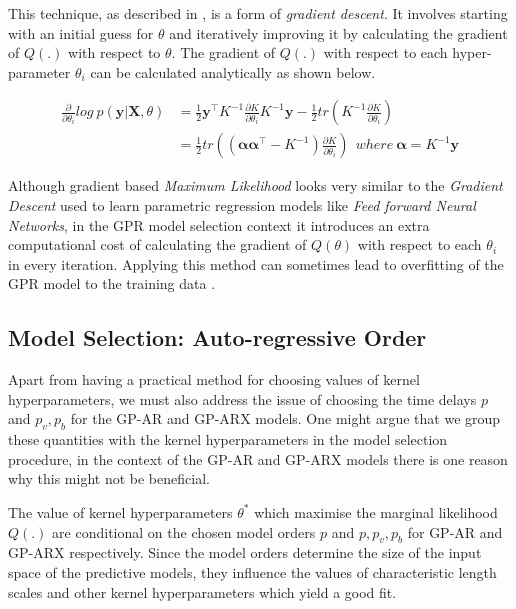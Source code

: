 \documentclass{article}
\begin{document}
This technique, as described in \citet{Rasmussen:2005:GPM:1162254}, is a form of \emph{gradient descent}. It involves starting with an initial guess for $\theta$ and iteratively improving it by calculating the gradient of $Q(.)$ with respect to $\theta$. The gradient of $Q(.)$ with respect to each hyper-parameter $\theta_i$ can be calculated analytically as shown below.

\begin{align*}
  \frac{\partial}{\partial \theta_i} log \ p(\mathbf{y}|\mathbf{X}, \theta) & = \frac{1}{2} \mathbf{y}^\intercal K^{-1} \frac{\partial K}{\partial \theta_i} K^{-1} \mathbf{y}  - \frac{1}{2} tr(K^{-1} \frac{\partial K}{\partial \theta_i})\\
                                                                            & = \frac{1}{2} tr((\mathbf{\alpha}\mathbf{\alpha}^\intercal - K^{-1}) \frac{\partial K}{\partial \theta_i}) \ \ where \ \mathbf{\alpha} = K^{-1} \mathbf{y}
\end{align*}


Although gradient based \emph{Maximum Likelihood} looks very similar to the \emph{Gradient Descent} used to learn parametric regression models like \emph{Feed forward Neural Networks}, in the GPR model selection context it introduces an extra computational cost of calculating the gradient of $Q(\theta)$ with respect to each $\theta_i$ in every iteration. Applying this method can sometimes lead to overfitting of the GPR model to the training data \citep{Rasmussen:2005:GPM:1162254}.

\subsection{Model Selection: Auto-regressive Order}

Apart from having a practical method for choosing values of kernel hyperparameters, we must also address the issue of choosing the time delays $p$ and $p_v, p_b$ for the GP-AR and GP-ARX models. One might argue that we group these quantities with the kernel hyperparameters in the model selection procedure, in the context of the GP-AR and GP-ARX models there is one reason why this might not be beneficial. 

The value of kernel hyperparameters $\theta^*$ which maximise the marginal likelihood $Q(.)$ are conditional on the chosen model orders $p$ and $p, p_v, p_b$ for GP-AR and GP-ARX respectively. Since the model orders determine the size of the input space of the predictive models, they influence the values of characteristic length scales and other kernel hyperparameters which yield a good fit.
\end{document}
